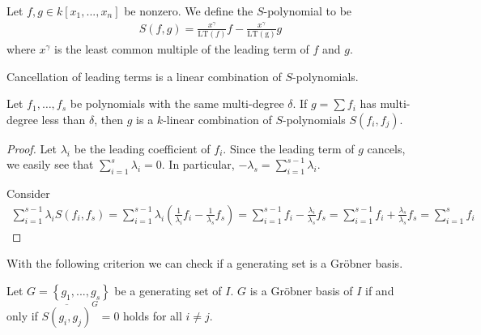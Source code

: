 \documentclass[a4paper, 11pt]{article}
\begin{document}
\begin{defi}[\( S \)-polynomial]
  Let \( f,g \in k[x_1,...,x_n] \) be nonzero. We define the \( S \)-polynomial to be 
  \begin{align*}
    S(f,g) = \frac{x^\gamma}{\mathrm{LT}(f)}f - \frac{x^\gamma}{\mathrm{LT(g)}}g
  \end{align*}
  where \( x^\gamma \) is the least common multiple of the leading term of \( f \) and \( g \).
\end{defi}

Cancellation of leading terms is a linear combination of \( S \)-polynomials.

\begin{lemma}\label{lemma:s-polynomial}
  Let \(  f_1,\dots,f_s \) be polynomials with the same multi-degree \( \delta \). If \( g = \sum f_i \) has multi-degree less than \( \delta \), then \( g \) is a \( k \)-linear combination of \( S \)-polynomials \( S(f_i,f_j) \).
\end{lemma}

\begin{proof}
  Let \( \lambda_i \) be the leading coefficient of \( f_i \). Since the leading term of \( g \) cancels, we easily see that \( \sum^s_{i=1} \lambda_i = 0 \). In particular, \( -\lambda_s = \sum_{i=1}^{s-1} \lambda_i \).

  Consider 
  \begin{align*}
    \sum^{s-1}_{i=1} \lambda_i S(f_i, f_s) = \sum^{s-1}_{i=1} \lambda_i \left( 
      \frac{1}{\lambda_i}f_i - \frac{1}{\lambda_s}f_s
     \right) = \sum^{s-1}_{i=1} f_i  - \frac{\lambda_i}{\lambda_s}f_s = \sum_{i=1}^{s-1} f_i + \frac{\lambda_s}{\lambda_s}f_s = \sum_{i=1}^s f_i
  \end{align*}
\end{proof}

With the following criterion we can check if a generating set is a Gröbner basis.

\begin{mdframed}
  \begin{prop}
    Let \( G = \left\{ g_1,...,g_s \right\} \) be a generating set of \( I \). \( G \) is a Gröbner basis of \( I \) if and only if \( \overline{S(g_i,g_j)}^{G} = 0 \) holds for all \( i \neq j \).
  \end{prop} 
\end{mdframed}
\end{document}
